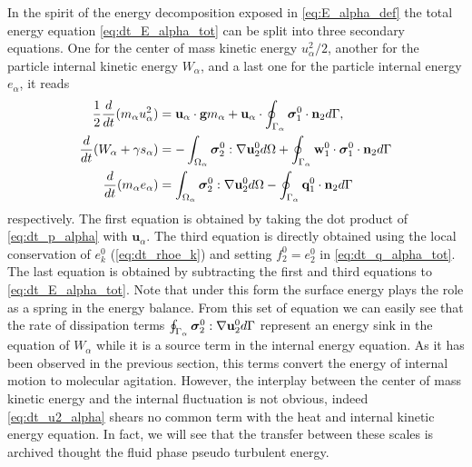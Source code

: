 In the spirit of the energy decomposition exposed in \ref{eq:E_alpha_def} the total energy equation \ref{eq:dt_E_alpha_tot} can be split into three secondary equations. 
One for the center of mass kinetic energy $u_\alpha^2/2$, another for the particle internal kinetic energy $W_\alpha$, and a last one for the particle internal energy $e_\alpha$, it reads
\begin{align}
    \label{eq:dt_u2_alpha}
    \frac{1}{2}\frac{d}{dt} (m_\alpha u_\alpha^2)
    &= 
    \textbf{u}_\alpha\cdot
    \textbf{g}m_\alpha
    + 
    \textbf{u}_\alpha\cdot
    \oint_{\Gamma_\alpha} \bm\sigma_1^0 \cdot \textbf{n}_2 d\Gamma,\\
    \label{eq:dt_w2_alpha}
    \frac{d}{dt} (W_\alpha + \gamma s_\alpha)
    &= 
    - \int_{\Omega_\alpha}  \bm{\sigma}_2^0 : \mathbf{\nabla}\textbf{u}_2^0  d\Omega
    + \oint_{\Gamma_\alpha} \textbf{w}_1^0 \cdot \bm{\sigma}_1^0 \cdot \textbf{n}_2  d\Gamma
    \\
     \label{eq:dt_e_alpha}
    \frac{d}{dt} (m_\alpha e_\alpha )
    &= 
     \int_{\Omega_\alpha}  \bm{\sigma}_2^0 : \mathbf{\nabla}\textbf{u}_2^0   d\Omega
    -  \oint_{\Gamma_\alpha} \textbf{q}_1^0\cdot \textbf{n}_2  d\Gamma 
\end{align}
respectively. 
The first equation is obtained by taking the dot product of \ref{eq:dt_p_alpha} with $\textbf{u}_\alpha$. 
The third equation is directly obtained using the local conservation of $e_k^0$ (\ref{eq:dt_rhoe_k}) and setting $f_2^0 = e_2^0$ in \ref{eq:dt_q_alpha_tot}.
The last equation is obtained by subtracting the first and third equations to \ref{eq:dt_E_alpha_tot}. 
Note that under this form the surface energy plays the role as a spring in the energy balance.   
From this set of equation we can easily see that the rate of dissipation terms $\oint_{\Gamma_\alpha} \bm{\sigma}_2^0 : \mathbf{\nabla}\textbf{u}_2^0 d\Gamma$ represent an energy sink in the equation of $W_\alpha$ while it is a source term in the internal energy equation. 
As it has been observed in the previous section, this terms convert the energy of internal motion to molecular agitation. 
However, the interplay between the center of mass  kinetic energy and the internal fluctuation is not obvious, indeed \ref{eq:dt_u2_alpha} shears no common term with the heat and internal kinetic energy equation.
In fact, we will see that the transfer between these scales is archived thought the fluid phase pseudo turbulent energy. 

